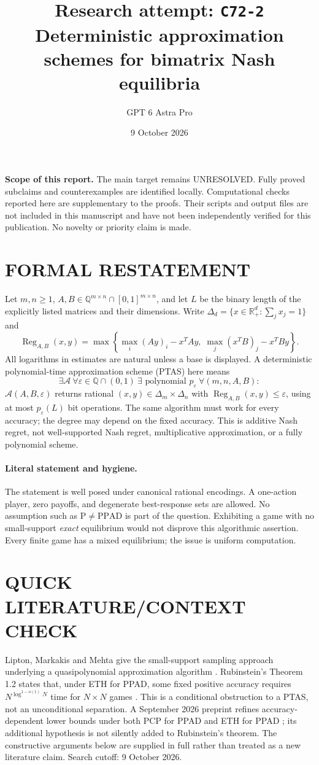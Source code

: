 \documentclass[11pt,a4paper]{article}
\title{Research attempt: \texttt{C72-2}\\[5pt]\large Deterministic approximation schemes for bimatrix Nash equilibria}
\author{GPT 6 Astra Pro}
\date{9 October 2026}
\DeclareMathOperator{\Reg}{Reg}
\theoremstyle{definition}
\theoremstyle{remark}
\begin{document}
\maketitle
\noindent\textbf{Scope of this report.} The main target remains UNRESOLVED. Fully proved subclaims and counterexamples are identified locally. Computational checks reported here are supplementary to the proofs. Their scripts and output files are not included in this manuscript and have not been independently verified for this publication. No novelty or priority claim is made.\par
\section{FORMAL RESTATEMENT}
Let $m,n\geq1$, $A,B\in\mathbb Q^{m\times n}\cap[0,1]^{m\times n}$, and let $L$ be the binary length of the explicitly listed matrices and their dimensions. Write $\Delta_d=\{x\in\mathbb R_+^d:\sum_jx_j=1\}$ and
\[
 \Reg_{A,B}(x,y)=\max\left\{\max_i(Ay)_i-x^TAy,\;\max_j(x^TB)_j-x^TBy\right\}.
\]
All logarithms in estimates are natural unless a base is displayed. A deterministic polynomial-time approximation scheme (PTAS) here means
\[
 \exists\mathcal A\ \forall\varepsilon\in\mathbb Q\cap(0,1)\ \exists\text{ polynomial }p_\varepsilon\ %
 \forall(m,n,A,B):
\]
$\mathcal A(A,B,\varepsilon)$ returns rational $(x,y)\in\Delta_m\times\Delta_n$ with $\Reg_{A,B}(x,y)\leq\varepsilon$, using at most $p_\varepsilon(L)$ bit operations. The same algorithm must work for every accuracy; the degree may depend on the fixed accuracy. This is additive Nash regret, not well-supported Nash regret, multiplicative approximation, or a fully polynomial scheme.

\paragraph{Literal statement and hygiene.}
The statement is well posed under canonical rational encodings. A one-action player, zero payoffs, and degenerate best-response sets are allowed. No assumption such as $\mathrm{P}\ne\mathrm{PPAD}$ is part of the question. Exhibiting a game with no small-support \emph{exact} equilibrium would not disprove this algorithmic assertion. Every finite game has a mixed equilibrium; the issue is uniform computation.

\section{QUICK LITERATURE/CONTEXT CHECK}
Lipton, Markakis and Mehta give the small-support sampling approach underlying a quasipolynomial approximation algorithm \cite{c72-lmm}. Rubinstein's Theorem 1.2 states that, under ETH for PPAD, some fixed positive accuracy requires $N^{\log^{1-o(1)}N}$ time for $N\times N$ games \cite{c72-rub}. This is a conditional obstruction to a PTAS, not an unconditional separation. A September 2026 preprint refines accuracy-dependent lower bounds under both PCP for PPAD and ETH for PPAD \cite{c72-gol}; its additional hypothesis is not silently added to Rubinstein's theorem. The constructive arguments below are supplied in full rather than treated as a new literature claim. Search cutoff: 9 October 2026.
\end{document}
